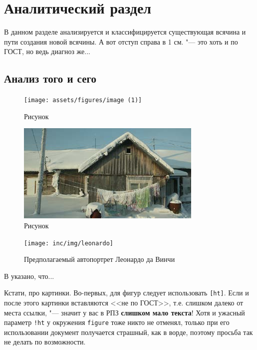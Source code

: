 \chapter{Аналитический раздел}
\label{cha:analysis}
%
%
В данном разделе анализируется и классифицируется существующая всячина и пути создания новой всячины. А вот отступ справа в 1 см. "--- это хоть и по ГОСТ, но ведь диагноз же...

\section{Анализ того и сего}


\begin{figure}
  \centering
  \texttt{[image: assets/figures/image (1)]}
  \caption{Рисунок}
  \label{fig:fig01}
\end{figure}

\begin{figure}
  \centering
  \includegraphics[width=\textwidth]{assets/figures/image}
  \caption{Рисунок}
  \label{fig:fig02}
\end{figure}

\begin{figure}
  \centering
  \texttt{[image: inc/img/leonardo]}
  \caption{Предполагаемый автопортрет Леонардо да Винчи}
  \label{fig:leonardo}
\end{figure}

В \cite{wiki:latex} указано, что... \cite{Pup09}

Кстати, про картинки. Во-первых, для фигур следует использовать \texttt{[ht]}. Если и после этого картинки вставляются <<не по ГОСТ>>, т.е. слишком далеко от места ссылки, "--- значит у вас в РПЗ \textbf{слишком мало текста}! Хотя и ужасный параметр \texttt{!ht} у окружения \texttt{figure} тоже никто не отменял, только при его использовании документ получается страшный, как в ворде, поэтому просьба так не делать по возможности.

